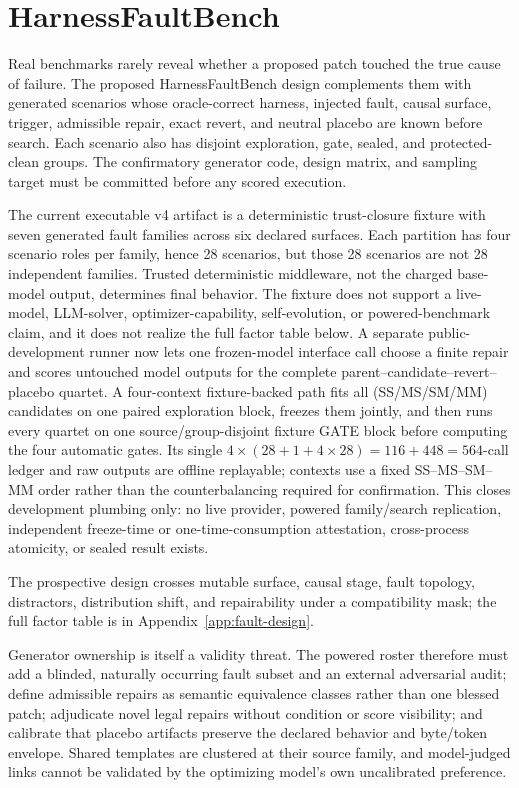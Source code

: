 \section{HarnessFaultBench}
\label{sec:faultbench}

Real benchmarks rarely reveal whether a proposed patch touched the true cause
of failure.  The proposed HarnessFaultBench design complements them with
generated scenarios whose
oracle-correct harness, injected fault, causal surface, trigger, admissible
repair, exact revert, and neutral placebo are known before search.  Each
scenario also has disjoint exploration, gate, sealed, and protected-clean
groups.  The confirmatory generator code, design matrix, and sampling target
must be committed before any scored execution.

The current executable v4 artifact is a deterministic trust-closure fixture
with seven generated fault families across six declared surfaces.  Each
partition has four scenario roles per family, hence 28 scenarios, but those 28
scenarios are not 28 independent families.  Trusted deterministic middleware,
not the charged base-model output, determines final behavior.  The fixture does
not support a live-model, LLM-solver, optimizer-capability, self-evolution, or
powered-benchmark claim, and it does not realize the full factor table below.
A separate public-development runner now lets one frozen-model interface call
choose a finite repair and scores untouched model outputs for the complete
parent--candidate--revert--placebo quartet.  A four-context fixture-backed path
fits all (SS/MS/SM/MM) candidates on one paired exploration block, freezes
them jointly, and then runs every quartet on one source/group-disjoint fixture
GATE block before computing the four automatic gates.  Its single
\(4\times(28+1+4\times28)=116+448=564\)-call ledger and raw outputs are
offline replayable; contexts use a fixed SS--MS--SM--MM order rather than the
counterbalancing required for confirmation.  This closes development
plumbing only: no live provider, powered family/search replication, independent
freeze-time or one-time-consumption attestation, cross-process atomicity, or
sealed result exists.

The prospective design crosses mutable surface, causal stage, fault topology,
distractors, distribution shift, and repairability under a compatibility mask;
the full factor table is in Appendix~\ref{app:fault-design}.

Generator ownership is itself a validity threat.  The powered roster therefore
must add a blinded, naturally occurring fault subset and an external adversarial
audit; define admissible repairs as semantic equivalence classes rather than one
blessed patch; adjudicate novel legal repairs without condition or score
visibility; and calibrate that placebo artifacts preserve the declared behavior
and byte/token envelope.  Shared templates are clustered at their source family,
and model-judged links cannot be validated by the optimizing model's own
uncalibrated preference.

